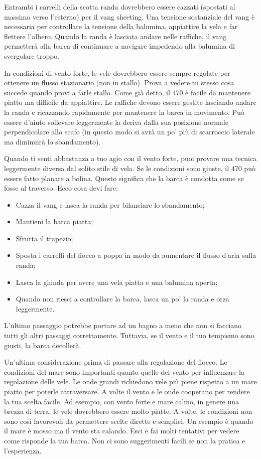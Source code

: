 Entrambi i carrelli della scotta randa dovrebbero essere cazzati (spostati al massimo
verso l'esterno) per il vang sheeting. Una tensione sostanziale del vang è
necessaria per controllare la tensione della balumina, appiattire la vela e far
flettere l'albero. Quando la randa è lasciata andare nelle raffiche, il vang
permetterà alla barca di continuare a navigare impedendo alla balumina di
svergolare troppo.

In condizioni di vento forte, le vele dovrebbero essere sempre regolate per
ottenere un flusso stazionario (non in stallo). Prova a vedere tu stesso cosa succede quando provi
a farle stallo. Come già detto, il
470 è facile da mantenere piatto ma difficile da appiattire. Le raffiche devono
essere gestite lasciando andare la randa e ricazzando rapidamente per mantenere
la barca in movimento. Può essere d'aiuto sollevare leggermente la deriva dalla
sua posizione normale perpendicolare allo scafo (in questo modo si avrà un po'
più di scarroccio laterale ma diminuirà lo sbandamento).

Quando ti senti abbastanza a tuo agio con il vento forte, puoi provare una
tecnica leggermente diversa dal solito stile di vela. Se le condizioni sono
giuste, il 470 può essere fatto planare a bolina. Questo significa che la barca
è condotta come se fosse al traverso. Ecco cosa devi fare:
\begin{itemize}
      \item Cazza il vang e lasca la randa per bilanciare lo sbandamento;
      \item Mantieni la barca piatta;
      \item Sfrutta il trapezio;
      \item Sposta i carrelli del fiocco a poppa in modo da aumentare il flusso
            d'aria sulla randa;
      \item Lasca la ghinda per avere una vela piatta e una balumina aperta;
      \item Quando non riesci a controllare la barca, lasca un po' la randa e orza
            leggermente.
\end{itemize}
L'ultimo passaggio potrebbe portare ad un bagno a meno che non si facciano tutti
gli altri passaggi correttamente. Tuttavia, se il vento e il tuo tempismo sono
giusti, la barca decollerà.

Un'ultima considerazione prima di passare alla regolazione del fiocco. Le
condizioni del mare sono importanti quanto quelle del vento per influenzare la
regolazione delle vele. Le onde grandi richiedono vele più piene rispetto a un
mare piatto per poterle attraversare. A volte il vento e le onde cooperano per
rendere la tua scelta facile. Ad esempio, con vento forte e mare calmo, in
genere una brezza di terra, le vele dovrebbero essere molto piatte. A volte, le
condizioni non sono così favorevoli da permettere scelte dirette e semplici. Un
esempio è quando il mare è mosso ma il vento sta calando. Esci e fai molti tentativi per
vedere come risponde la tua barca. Non ci sono suggerimenti facili se non la
pratica e l'esperienza.

